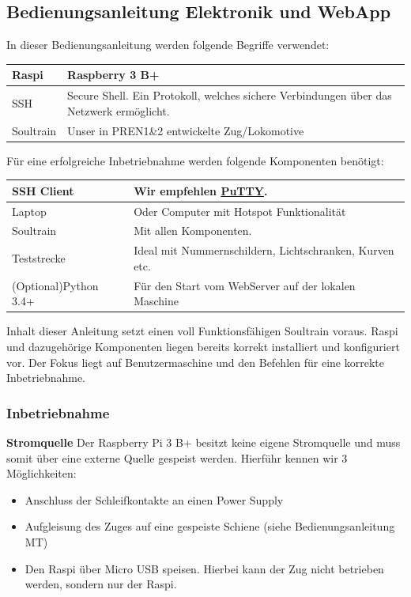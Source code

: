 \documentclass[../../main.tex]{subfiles}
\begin{document}
\subsection{Bedienungsanleitung Elektronik und WebApp}
In dieser Bedienungsanleitung werden folgende Begriffe verwendet:
\begin{table}[H]
    \begin{tabular}{ll}
    \hline
    Raspi & Raspberry 3 B+ \\ \hline
    SSH & Secure Shell. Ein Protokoll, welches sichere Verbindungen über das Netzwerk ermöglicht.\\ \hline
    Soultrain & Unser in PREN1\&2 entwickelte Zug/Lokomotive       \\ \hline
    \end{tabular}
\end{table}

Für eine erfolgreiche Inbetriebnahme werden folgende Komponenten benötigt:
\begin{table}[H]
    \begin{tabular}{ll}
    \hline
    SSH Client & Wir empfehlen \hyperref[https://www.putty.org/]{PuTTY}.\\ \hline
    Laptop & Oder Computer mit Hotspot Funktionalität\\ \hline
    Soultrain & Mit allen Komponenten.\\ \hline
    Teststrecke & Ideal mit Nummernschildern, Lichtschranken, Kurven etc.\\ \hline
    (Optional)Python 3.4+ & Für den Start vom WebServer auf der lokalen Maschine \\ \hline
    \end{tabular}
\end{table}

Inhalt dieser Anleitung setzt einen voll Funktionsfähigen Soultrain voraus. Raspi und dazugehörige Komponenten liegen bereits korrekt installiert und konfiguriert vor. Der Fokus liegt auf Benutzermaschine und den Befehlen für eine korrekte Inbetriebnahme.

\subsubsection{Inbetriebnahme}
\textbf{Stromquelle}
Der Raspberry Pi 3 B+ besitzt keine eigene Stromquelle und muss somit über eine externe Quelle gespeist werden. Hierführ kennen wir 3 Möglichkeiten:
\begin{itemize}
    \item Anschluss der Schleifkontakte an einen Power Supply
    \item Aufgleisung des Zuges auf eine gespeiste Schiene (siehe Bedienungsanleitung MT)
    \item Den Raspi über Micro USB speisen. Hierbei kann der Zug nicht betrieben werden, sondern nur der Raspi.
\end{itemize}
\end{document}

